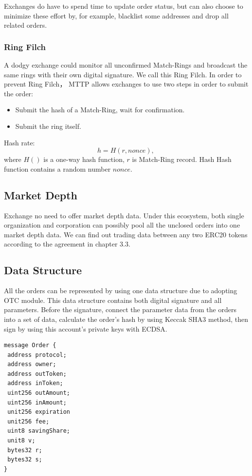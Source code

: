 \documentclass[UTF8,nofonts]{article}
\begin{document}
Exchanges do have to spend time to update order status, but can also choose to minimize these effort by, for example, blacklist some addresses and drop all related orders.

\subsubsection{Ring Filch}

A dodgy exchange could monitor all unconfirmed Match-Rings and broadcast the same rings with their own digital signature. We call this Ring Filch. In order to prevent Ring Filch， MTTP allows exchanges to use two steps in order to submit the order: 
\begin{itemize}
  \item Submit the hash of a Match-Ring, wait for confirmation.
  \item Submit the ring itself.
\end{itemize}
Hash rate:
$$h = H(r,  nonce)\text{, }$$
where $H()$ is a one-way hash function, $r$ is Match-Ring record. Hash Hash function contains a random number $nonce$.

\subsection{Market Depth\label{sec: marketdepth}}

Exchange no need to offer market depth data. Under this ecosystem,  both single organization and corporation can possibly pool all the unclosed orders into one market depth data. We can find out trading data between any two ERC20 tokens according to the agreement in chapter 3.3.

\subsection{Data Structure\label{sec: dataformat}}

All the orders can be represented by using one data structure due to adopting OTC module. This  data structure contains both digital signature and all parameters. Before the signature,  connect the parameter data from the orders into a set of data,  calculate the order's hash by using Keccak SHA3 method,  then sign by using this account's private keys with ECDSA.


\begin{verbatim}
message Order {
 address protocol;
 address owner;
 address outToken;
 address inToken;
 uint256 outAmount;
 uint256 inAmount;
 unit256 expiration
 unit256 fee;
 uint8 savingShare;
 unit8 v;
 bytes32 r;
 bytes32 s;
}
\end{verbatim}
\end{document}
